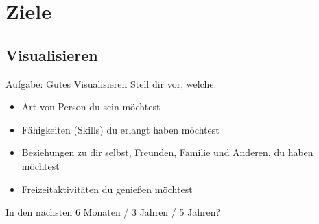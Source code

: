 \section{Ziele}

\subsection{Visualisieren}




\begin{frame}[c]
    \begin{block}{Aufgabe: Gutes Visualisieren}
    Stell dir vor, welche:
    \begin{itemize}
        \item Art von Person du sein möchtest
        \item Fähigkeiten (Skills) du erlangt haben möchtest
        \item Beziehungen zu dir selbst, Freunden, Familie und Anderen, du haben möchtest
        \item Freizeitaktivitäten du genießen möchtest
    \end{itemize}
    \pause
    In den nächsten 6 Monaten / 3 Jahren / 5 Jahren?
    \end{block}
\end{frame}



